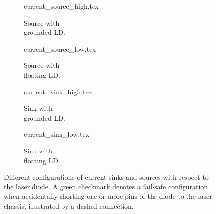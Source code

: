 \begin{figure}[ht]
    \centering
    \begin{subfigure}{0.225\linewidth}
        \centering
        {current_source_high.tex}
        \caption{Source with\protect\\grounded LD.}
        \label{fig:current_source_high}
    \end{subfigure}
    \begin{subfigure}{0.225\linewidth}
        \centering
        {current_source_low.tex}
        \caption{Source with\protect\\floating LD.}
        \label{fig:current_source_low}
    \end{subfigure}
    \begin{subfigure}{0.225\linewidth}
        \centering
        {current_sink_high.tex}
        \caption{Sink with\protect\\grounded LD.}
        \label{fig:current_sink_high}
    \end{subfigure}
    \begin{subfigure}{0.225\linewidth}
        \centering
        {current_sink_low.tex}
        \caption{Sink with\protect\\floating LD.}
        \label{fig:current_sink_low}
    \end{subfigure}
    \caption{Different configurations of current sinks and sources with respect to the laser diode. A green checkmark denotes a fail-safe configuration when accidentally shorting one or more pins of the diode to the laser chassis, illustrated by a dashed connection.}
    \label{fig:current_sink_source}
\end{figure}

